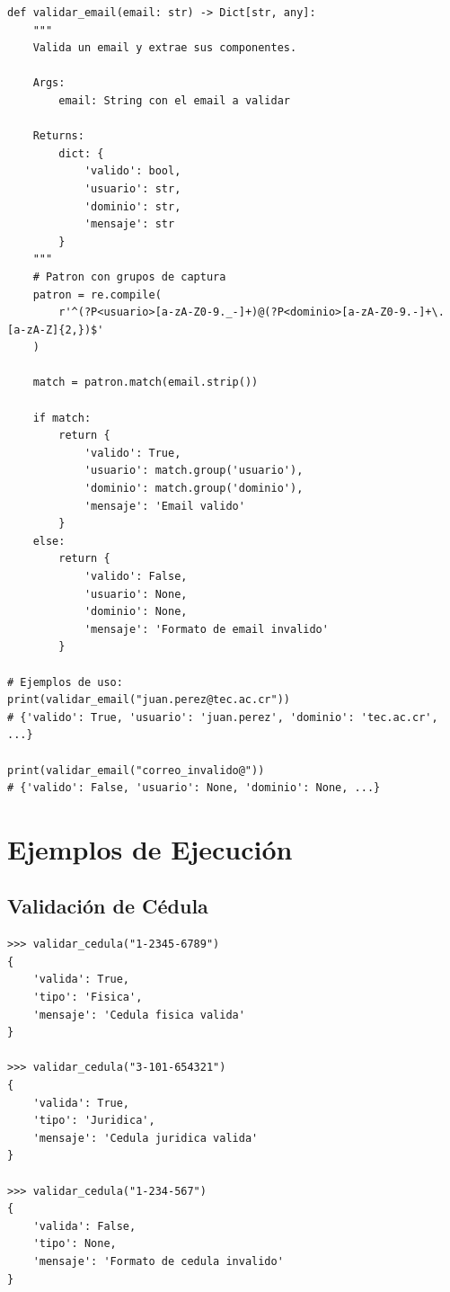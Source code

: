 \documentclass[11pt,letterpaper]{article}
\begin{document}
\begin{lstlisting}[caption={Ejemplo: Validador de email completo}]
def validar_email(email: str) -> Dict[str, any]:
    """
    Valida un email y extrae sus componentes.
    
    Args:
        email: String con el email a validar
        
    Returns:
        dict: {
            'valido': bool,
            'usuario': str,
            'dominio': str,
            'mensaje': str
        }
    """
    # Patron con grupos de captura
    patron = re.compile(
        r'^(?P<usuario>[a-zA-Z0-9._-]+)@(?P<dominio>[a-zA-Z0-9.-]+\.[a-zA-Z]{2,})$'
    )
    
    match = patron.match(email.strip())
    
    if match:
        return {
            'valido': True,
            'usuario': match.group('usuario'),
            'dominio': match.group('dominio'),
            'mensaje': 'Email valido'
        }
    else:
        return {
            'valido': False,
            'usuario': None,
            'dominio': None,
            'mensaje': 'Formato de email invalido'
        }

# Ejemplos de uso:
print(validar_email("juan.perez@tec.ac.cr"))
# {'valido': True, 'usuario': 'juan.perez', 'dominio': 'tec.ac.cr', ...}

print(validar_email("correo_invalido@"))
# {'valido': False, 'usuario': None, 'dominio': None, ...}
\end{lstlisting}

\section{Ejemplos de Ejecución}

\subsection{Validación de Cédula}

\begin{lstlisting}[caption={Ejemplo de validación de cédulas}]
>>> validar_cedula("1-2345-6789")
{
    'valida': True,
    'tipo': 'Fisica',
    'mensaje': 'Cedula fisica valida'
}

>>> validar_cedula("3-101-654321")
{
    'valida': True,
    'tipo': 'Juridica',
    'mensaje': 'Cedula juridica valida'
}

>>> validar_cedula("1-234-567")
{
    'valida': False,
    'tipo': None,
    'mensaje': 'Formato de cedula invalido'
}
\end{lstlisting}
\end{document}
